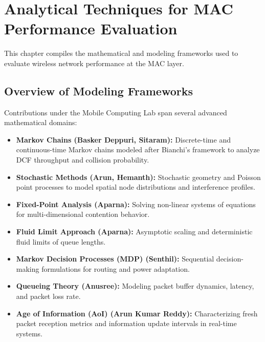 \chapter{Analytical Techniques for MAC Performance Evaluation}
\label{sec:chapter13}

This chapter compiles the mathematical and modeling frameworks used to evaluate wireless network performance at the MAC layer.

\section{Overview of Modeling Frameworks}
Contributions under the Mobile Computing Lab span several advanced mathematical domains:
\begin{itemize}
    \item \textbf{Markov Chains (Basker Deppuri, Sitaram):} Discrete-time and continuous-time Markov chains modeled after Bianchi's framework to analyze DCF throughput and collision probability.
    \item \textbf{Stochastic Methods (Arun, Hemanth):} Stochastic geometry and Poisson point processes to model spatial node distributions and interference profiles.
    \item \textbf{Fixed-Point Analysis (Aparna):} Solving non-linear systems of equations for multi-dimensional contention behavior.
    \item \textbf{Fluid Limit Approach (Aparna):} Asymptotic scaling and deterministic fluid limits of queue lengths.
    \item \textbf{Markov Decision Processes (MDP) (Senthil):} Sequential decision-making formulations for routing and power adaptation.
    \item \textbf{Queueing Theory (Anusree):} Modeling packet buffer dynamics, latency, and packet loss rate.
    \item \textbf{Age of Information (AoI) (Arun Kumar Reddy):} Characterizing fresh packet reception metrics and information update intervals in real-time systems.
\end{itemize}
